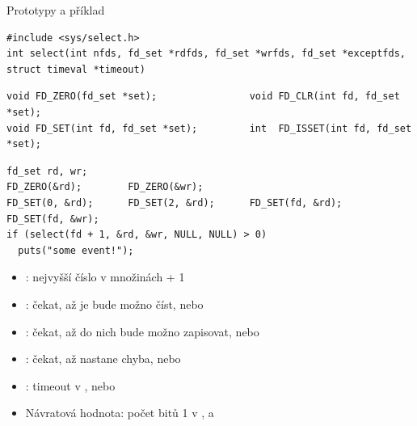 
\begin{frame}[fragile]{}

  \begin{block}{Prototypy a příklad}
    \begin{lstlisting}[aboveskip=2pt,belowskip=0pt]
#include <sys/select.h>
int select(int nfds, fd_set *rdfds, fd_set *wrfds, fd_set *exceptfds, struct timeval *timeout)
    \end{lstlisting}
    \begin{lstlisting}[aboveskip=0pt,belowskip=2pt]
void FD_ZERO(fd_set *set);                void FD_CLR(int fd, fd_set *set);
void FD_SET(int fd, fd_set *set);         int  FD_ISSET(int fd, fd_set *set);
    \end{lstlisting}
    \begin{lstlisting}[aboveskip=2pt,belowskip=2pt]
fd_set rd, wr;
FD_ZERO(&rd);        FD_ZERO(&wr);
FD_SET(0, &rd);      FD_SET(2, &rd);      FD_SET(fd, &rd);      FD_SET(fd, &wr);
if (select(fd + 1, &rd, &wr, NULL, NULL) > 0)
  puts("some event!");
  \end{lstlisting}
  \end{block}


  \begin{itemize}
    \item {}: nejvyšší číslo  v množinách + 1

    \pause

    \item {}: čekat, až je bude možno číst, nebo 
    \item {}: čekat, až do nich bude možno zapisovat, nebo
    \item {}: čekat, až nastane chyba, nebo 

    \pause

    \item {}: timeout v , nebo 

    \pause

    \item Návratová hodnota: počet bitů 1 v ,  a
  \end{itemize}

\end{frame}

